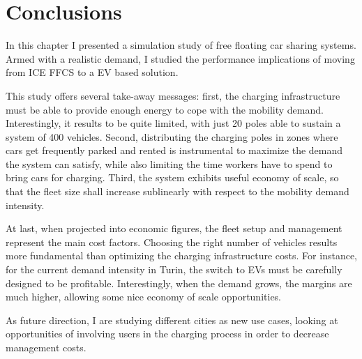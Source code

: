 \section{Conclusions}
\label{sec:10_6_conclusions}


In this chapter I presented a simulation study of free floating car sharing systems. Armed with a realistic demand, I studied the performance implications of moving from ICE FFCS to a EV based solution.

This study offers several take-away messages: first, the charging infrastructure must be able to provide enough energy to cope with the mobility demand. Interestingly, it results to be quite limited, with just 20 poles able to sustain a system of 400 vehicles.
Second, distributing the charging poles in zones where cars get frequently parked and rented is instrumental to maximize the demand the system can satisfy, while also limiting the time workers have to spend to bring cars for charging.
Third, the system exhibits useful economy of scale, so that the fleet size shall increase sublinearly with respect to the mobility demand intensity. 

At last, when projected into economic figures, the fleet setup and management represent the main cost factors. Choosing the right number of vehicles results more fundamental than optimizing the charging infrastructure costs. For instance, for the current demand intensity in Turin, the switch to EVs must be carefully designed to be profitable. Interestingly, when the demand grows, the margins are much higher, allowing some nice economy of scale opportunities.

As future direction, I are studying different cities as new use cases, looking at opportunities of involving users in the charging process in order to decrease management costs.